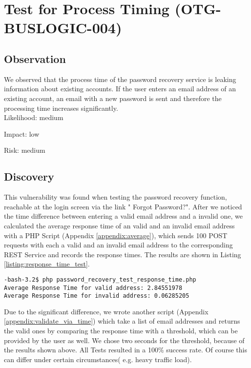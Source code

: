 \chapter{Test for Process Timing (OTG-BUSLOGIC-004)}
\section{Observation}
	We observed that the process time of the password recovery service is leaking information about existing accounts.
	If the user enters an email address of an existing account, an email with a new password is sent and therefore the processing time increases significantly.\\


Likelihood: medium \newline

Impact: low\newline

Risk: medium\newline

\section{Discovery}
This vulnerability was found when testing the password recovery function, reachable at the login screen via the link " Forgot Password?".
After we noticed the time difference between entering a valid email address and a invalid one, we calculated the average response time of an valid and an invalid email address with a PHP Script (Appendix \ref{appendix:average}), which sends  100 POST requests with each a valid and an invalid email address to the corresponding REST Service and records the response times. The results are shown in Listing \ref{listing:response_time_test}.

\begin{lstlisting}[caption= Results of Testing Respone Time of Password Receovery ,label=listing:response_time_test]
-bash-3.2$ php password_recovery_test_response_time.php 
Average Response Time for valid address: 2.84551978
Average Response Time for invalid address: 0.06285205
\end{lstlisting}

Due to the significant difference, we wrote another script (Appendix \ref{appendix:validate_via_time}) which take a list of email addresses and returns the valid ones by comparing the response time with a threshold, which can be provided by the user as well. We chose two seconds for the threshold, because of the results shown above. All Tests resulted in a 100\% success rate. Of course this can differ under certain circumstances( e.g. heavy traffic load). 

